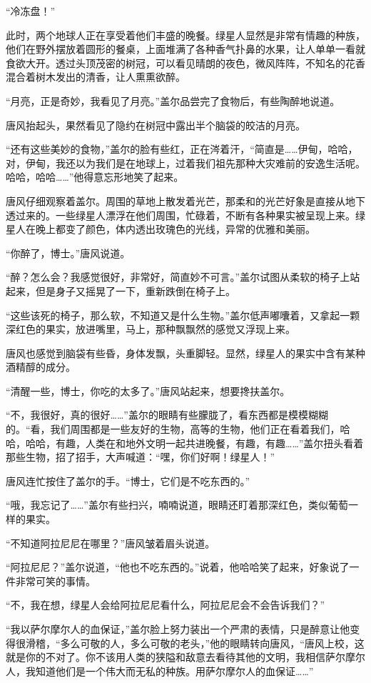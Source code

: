 “冷冻盘！”

此时，两个地球人正在享受着他们丰盛的晚餐。绿星人显然是非常有情趣的种族，他们在野外摆放着圆形的餐桌，上面堆满了各种香气扑鼻的水果，让人单单一看就食欲大开。透过头顶茂密的树冠，可以看见晴朗的夜色，微风阵阵，不知名的花香混合着树木发出的清香，让人熏熏欲醉。

“月亮，正是奇妙，我看见了月亮。”盖尔品尝完了食物后，有些陶醉地说道。

唐风抬起头，果然看见了隐约在树冠中露出半个脑袋的皎洁的月亮。

“还有这些美妙的食物，”盖尔的脸有些红，正在涔着汗，“简直是……伊甸，哈哈，对，伊甸，我还以为我们是在地球上，过着我们祖先那种大灾难前的安逸生活呢。哈哈，哈哈……”他得意忘形地笑了起来。

唐风仔细观察着盖尔。周围的草地上散发着光芒，那柔和的光芒好象是直接从地下透过来的。一些绿星人漂浮在他们周围，忙碌着，不断有各种果实被呈现上来。绿星人在晚上都变了颜色，体内透出玫瑰色的光线，异常的优雅和美丽。

“你醉了，博士。”唐风说道。

“醉？怎么会？我感觉很好，非常好，简直妙不可言。”盖尔试图从柔软的椅子上站起来，但是身子又摇晃了一下，重新跌倒在椅子上。

“这些该死的椅子，那么软，不知道又是什么生物。”盖尔低声嘟囔着，又拿起一颗深红色的果实，放进嘴里，马上，那种飘飘然的感觉又浮现上来。

唐风也感觉到脑袋有些昏，身体发飘，头重脚轻。显然，绿星人的果实中含有某种酒精醇的成分。

“清醒一些，博士，你吃的太多了。”唐风站起来，想要搀扶盖尔。

“不，我很好，真的很好……”盖尔的眼睛有些朦胧了，看东西都是模模糊糊的。“看，我们周围都是一些友好的生物，高等的生物，他们正在看着我们，哈哈，哈哈，有趣，人类在和地外文明一起共进晚餐，有趣，有趣……”盖尔扭头看着那些生物，招了招手，大声喊道：“嘿，你们好啊！绿星人！”

唐风连忙按住了盖尔的手。“博士，它们是不吃东西的。”

“哦，我忘记了……”盖尔有些扫兴，喃喃说道，眼睛还盯着那深红色，类似葡萄一样的果实。

“不知道阿拉尼尼在哪里？”唐风皱着眉头说道。

“阿拉尼尼？”盖尔说道，“他也不吃东西的。”说着，他哈哈笑了起来，好象说了一件非常可笑的事情。

“不，我在想，绿星人会给阿拉尼尼看什么，阿拉尼尼会不会告诉我们？”

“我以萨尔摩尔人的血保证，”盖尔脸上努力装出一个严肃的表情，只是醉意让他变得很滑稽，“多么可敬的人，多么可敬的老头，”他的眼睛转向唐风，“唐风上校，这就是你的不对了。你不该用人类的狭隘和敌意去看待其他的文明，我相信萨尔摩尔人，我知道他们是一个伟大而无私的种族。用萨尔摩尔人的血保证……”

